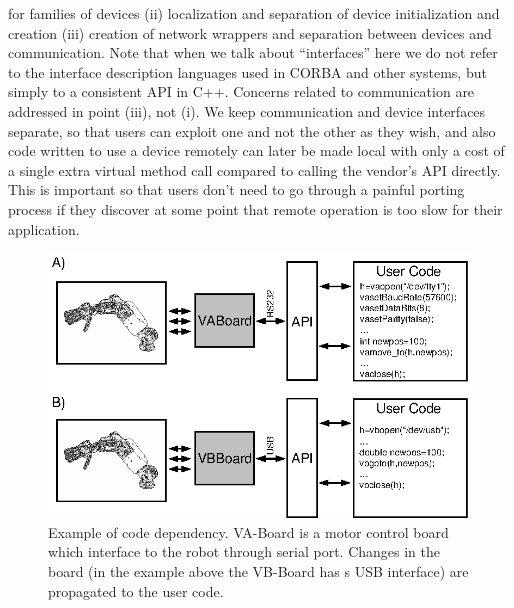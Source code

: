 for families of devices (ii) localization and separation of device 
initialization and creation (iii) creation of network wrappers and separation 
between devices and communication. 
%
Note that when we talk about ``interfaces'' here we do not refer to
the interface description languages used in CORBA and other systems,
but simply to a consistent API in C++.  Concerns related to
communication are addressed in point (iii), not (i).  We keep
communication and device interfaces separate, so that users can
exploit one and not the other as they wish, and also code written to
use a device remotely can later be made local with only a cost of a
single extra virtual method call compared to calling the vendor's API directly.
This is important so that users don't need to go through a painful
porting process if they discover at some point that remote operation
is too slow for their application.

\begin{figure}[tbp]
\centerline{
\includegraphics[width=24cm]{fig-devices1}
}
\caption{Example of code dependency. VA-Board is a 
motor control board which interface to the robot through serial port. 
Changes in the board (in the example above the VB-Board has s USB 
interface) are propagated to the user code.}\label{fig:devices1}
\end{figure}

